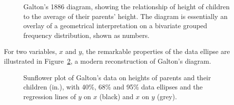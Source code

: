 \documentclass[
  letterpaper,
  10pt,
  krantz2]{krantz}
\begin{document}
\begin{figure}


\caption{\label{fig-galton-corr}Galton's 1886 diagram, showing the
relationship of height of children to the average of their parents'
height. The diagram is essentially an overlay of a geometrical
interpretation on a bivariate grouped frequency distribution, shown as
numbers.}

\end{figure}%

For two variables, \(x\) and \(y\), the remarkable properties of the
data ellipse are illustrated in Figure~\ref{fig-galton-ellipse-r}, a
modern reconstruction of Galton's diagram.

\begin{figure}


\caption{\label{fig-galton-ellipse-r}Sunflower plot of Galton's data on
heights of parents and their children (in.), with 40\%, 68\% and 95\%
data ellipses and the regression lines of \(y\) on \(x\) (black) and
\(x\) on \(y\) (grey).}

\end{figure}%
\end{document}
